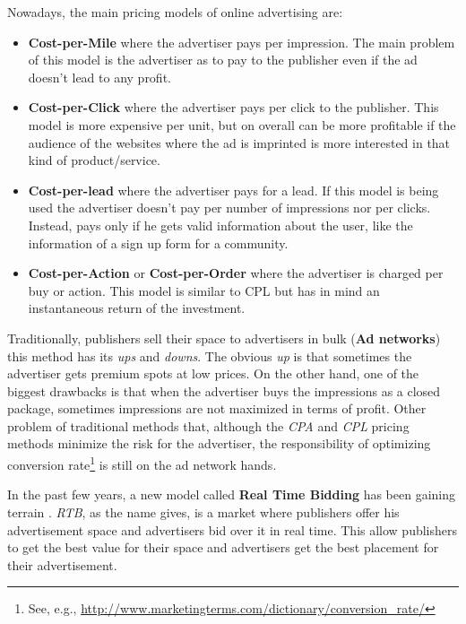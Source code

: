 Nowadays, the main pricing models of online advertising are:
\begin{itemize}
\item\textbf{Cost-per-Mile} where the advertiser pays per impression. The main problem of this model is the advertiser as to pay to the publisher even
if the ad doesn't lead to any profit.
\item\textbf{Cost-per-Click} where the advertiser pays per click to the publisher. This model is more expensive per unit\cite{Performics}, but on overall can be more
profitable\cite{Performics} if the audience of the websites where the ad is imprinted is more interested in that kind of product/service\cite{Andrea2004}.
\item\textbf{Cost-per-lead} where the advertiser pays for a lead. If this model is being used the advertiser doesn't pay per number of impressions nor per clicks. Instead, pays only
if he gets valid information about the user, like the information of a sign up form for a community.
\item\textbf{Cost-per-Action} or \textbf{Cost-per-Order} where the advertiser is charged per buy or action. This model is similar to CPL but has in mind an instantaneous return of
the investment.
\end{itemize}

Traditionally, publishers sell their space to advertisers in bulk (\textbf{Ad networks}) this method has its \textit{ups} and \textit{downs}.
The obvious \textit{up} is that sometimes the advertiser gets premium spots at low prices.
On the other hand, one of the biggest drawbacks is that when the advertiser buys the impressions as a
closed package, sometimes impressions are not maximized in terms of profit.
Other problem of traditional methods that, although the \emph{CPA} and \emph{CPL} pricing methods minimize the risk for the advertiser, the responsibility of
optimizing conversion rate\footnote{ See, e.g., \url{http://www.marketingterms.com/dictionary/conversion_rate/}} is still
on the ad network hands.\cite{Yuan:2013:RBO:2501040.2501980}

In the past few years, a new model called \textbf{Real Time Bidding} has been gaining terrain \cite{Adfonic}.
\emph{RTB}, as the name gives, is a market where publishers offer his advertisement space and advertisers bid over it in real time. This allow publishers to get
the best value for their space and advertisers get the best placement for their advertisement.

